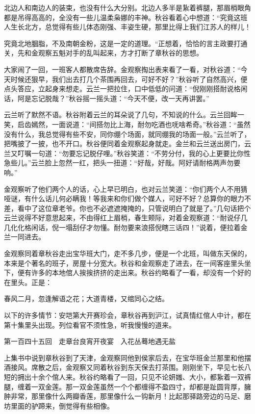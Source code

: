 \documentclass[12pt,UTF8]{ctexbook}
\begin{document}
{{{北边人和南边人的装束，也没有什么大分别。北边人多半是紥着裤腿，那眉梢眼角都是吊得高高的，全没有一些儿温柔枭娜的丰神。秋谷看着心中想道：“究竟这班人生长北方，总觉得有些儿体态刚强、丰姿生硬，那里比得上我们江苏人的样儿！

究竟北地胭脂，不及南朝金粉，这是一定的道理。“正想着，恰恰的言主政要打通关，先和金观察五魁对手的乱叫起来，方才打断了章秋谷的思想。

大家闹了一回，一班客人都散席告辞。金观察掏出表来看了一看，对秋谷道：“今天时候还狠早，我们出去打几个茶围再回去，可好不好？”秋谷听了自然高兴，便点头答应，立起身来想走。云兰一把拉住，口中低低的问道：“倪刚刚搭耐说格闲话，阿是忘记脱哉？”秋谷摇一摇头道：“今天不便，改一天再讲罢。”

云兰听了默然不语。秋谷附着云兰的耳朵说了几句，不知说的什么。云兰回眸一笑，启齿嫣然，一面说道：“间搭勿比上海，耐勿吃酒也呒啥希奇。”秋谷道：“虽然没有什么，我总觉得有些不安，同你绷个场面，就同绷我的场面一般。”云兰听了，把嘴披了一披，也不开口。秋谷便同着金观察起身就走。金兰和云兰送出房门，云兰又叮嘱一句道：“勿要忘记脱仔哩。”秋谷笑道：“不劳分付，我的心上更要比你性急些儿。”云兰脸上忽然一红，把头一扭道：“好哉，好哉。阿好请耐格两声勿要响。”

金观察听了他们两个人的话，心上早已明白，也对云兰笑道：“你们两个人不用猜哑谜，有什么话儿何必瞒我！等我来和你们做个媒人，可好不好？总算你的眼力不差，看中了这位章老爷。你也不必遮遮掩掩的，只管说明白了就是了。”几句话把个云兰说得不好意思起来，不由得红上眉梢，春生颊际，对着金观察道：“耐说仔几几化化格闲话，倪一塌刮仔才勿懂。耐勿要来浪搭倪瞎三话四！”说着，便拉着金兰一同进去。

金观察同着章秋谷走出宝华班大门，走不多几步，便是一个北班，叫做东天保的，本来是个著名的班子，房屋十分宽大。秋谷和金观察走了进去，在一间客座里头坐下，便有许多的本地倌人挨挨挤挤的走出来。秋谷约略看了一看，却没有一个好的在里头。正是：

春风二月，忽逢解语之花；大道青楼，又绾同心之结。

以下的许多情节：安垲第大开赛珍会，章秋谷再到沪江，试真情红倌人中计，都在第十集里头出现。列位看官不须性急，听我慢慢的道来。





第一百四十五回　走章台良宵开夜宴　入花丛蓦地遇无盐





上集书中说到章秋谷到了天津，金观察同他到侯家后去，在宝华班金兰那里和他摆酒接风。席散之后，金观察又同着秋谷到东天保去打茶围。刚刚坐下，早见七长八短的拥出十余个倌人来。秋谷约略看了一回，只见不论妍媸、大小，都紥着一双裤腿，缠着一双金莲。那一双金莲虽然一个个都缠得不盈四寸，却都是趾圆背厚，臃肿非常，那里像什么两瓣香莲，那里像什么一钩新月！比起那驿路旁边的马足、磨坊里面的驴蹄来，倒觉得有些相像。

}}}
\end{document}
